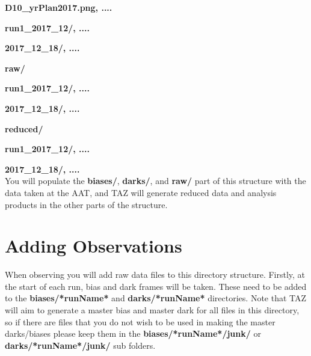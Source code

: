 \documentclass[12pt]{article}
\begin{document}
\hspace{15mm} \textbf{D10\_yrPlan2017.png, ....} 
\vspace{1mm}

\hspace{15mm} \textbf{run1\_2017\_12/, ....} 
\vspace{1mm}

\hspace{20mm} \textbf{2017\_12\_18/, ....}
\vspace{1mm}

\hspace{10mm} \textbf{raw/} 
\vspace{1mm}

\hspace{15mm} \textbf{run1\_2017\_12/, ....} 
\vspace{1mm}

\hspace{20mm} \textbf{2017\_12\_18/, ....} 
\vspace{1mm}

\hspace{10mm} \textbf{reduced/}
\vspace{1mm}

\hspace{15mm} \textbf{run1\_2017\_12/, ....} 
\vspace{1mm}

\hspace{20mm} \textbf{2017\_12\_18/, ....} \\

You will populate the \textbf{biases/}, \textbf{darks/}, and \textbf{raw/} part of this structure with the data taken at the AAT, and TAZ will generate reduced data and analysis products in the other parts of the structure.  


\section{Adding Observations}

When observing you will add raw data files to this directory structure. Firstly, at the start of each run, bias and dark frames will be taken. These need to be added to the \textbf{biases/*runName*} and \textbf{darks/*runName*} directories. Note that TAZ will aim to generate a master bias and master dark for all files in this directory, so if there are files that you do not wish to be used in making the master darks/biases please keep them in the  \textbf{biases/*runName*/junk/} or \textbf{darks/*runName*/junk/} sub folders.
\end{document}
